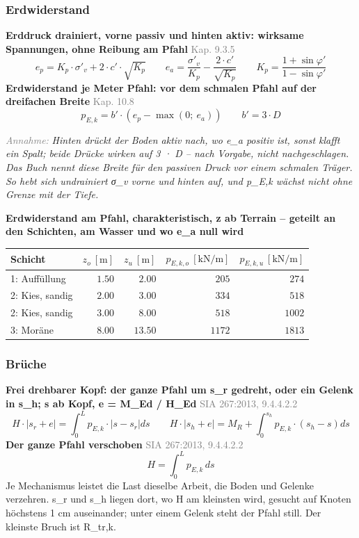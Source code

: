 \documentclass[11pt,a4paper]{article}
\newcommand{\normref}[1]{{\small\textcolor{gray}{#1}}}
\newcommand{\hinweis}[2]{\par\noindent\textcolor{gray}{\textit{#1:}} \textit{#2}\par}
\begin{document}
\subsubsection{Erdwiderstand}
\noindent\textbf{Erddruck drainiert, vorne passiv und hinten aktiv: wirksame Spannungen, ohne Reibung am Pfahl} \hfill \normref{Kap. 9.3.5}
\begin{equation*}
e_p = K_p \cdot \sigma'_v + 2 \cdot c' \cdot \sqrt{K_p} \qquad e_a = \frac{\sigma'_v}{K_p} - \frac{2 \cdot c'}{\sqrt{K_p}} \qquad K_p = \frac{1 + \sin\varphi'}{1 - \sin\varphi'}
\end{equation*}
\noindent\textbf{Erdwiderstand je Meter Pfahl: vor dem schmalen Pfahl auf der dreifachen Breite} \hfill \normref{Kap. 10.8}
\begin{equation*}
p_{E,k} = b' \cdot \left(e_p - \max\left(0;\ e_a\right)\right) \qquad b' = 3 \cdot D
\end{equation*}
\hinweis{Annahme}{Hinten drückt der Boden aktiv nach, wo e\_a positiv ist, sonst klafft ein Spalt; beide Drücke wirken auf 3 · D – nach Vorgabe, nicht nachgeschlagen. Das Buch nennt diese Breite für den passiven Druck vor einem schmalen Träger. So hebt sich undrainiert σ\_v vorne und hinten auf, und p\_E,k wächst nicht ohne Grenze mit der Tiefe.}
\noindent\textbf{Erdwiderstand am Pfahl, charakteristisch, z ab Terrain – geteilt an den Schichten, am Wasser und wo e\_a null wird}
\begin{longtable}{lrrrr}
\hline
Schicht & $z_o\ [\mathrm{m}]$ & $z_u\ [\mathrm{m}]$ & $p_{E,k,o}\ [\mathrm{kN/m}]$ & $p_{E,k,u}\ [\mathrm{kN/m}]$ \\
\hline
\endhead
1: Auffüllung & $1.50$ & $2.00$ & $205$ & $274$ \\
2: Kies, sandig & $2.00$ & $3.00$ & $334$ & $518$ \\
2: Kies, sandig & $3.00$ & $8.00$ & $518$ & $1002$ \\
3: Moräne & $8.00$ & $13.50$ & $1172$ & $1813$ \\
\hline
\end{longtable}
\subsubsection{Brüche}
\noindent\textbf{Frei drehbarer Kopf: der ganze Pfahl um s\_r gedreht, oder ein Gelenk in s\_h; s ab Kopf, e = M\_Ed / H\_Ed} \hfill \normref{SIA 267:2013, 9.4.4.2.2}
\begin{equation*}
H \cdot \left|s_r + e\right| = \int_0^L p_{E,k} \cdot \left|s - s_r\right| ds \qquad H \cdot \left|s_h + e\right| = M_R + \int_0^{s_h} p_{E,k} \cdot \left(s_h - s\right) ds
\end{equation*}
\noindent\textbf{Der ganze Pfahl verschoben} \hfill \normref{SIA 267:2013, 9.4.4.2.2}
\begin{equation*}
H = \int_0^L p_{E,k}\, ds
\end{equation*}
Je Mechanismus leistet die Last dieselbe Arbeit, die Boden und Gelenke verzehren. s\_r und s\_h liegen dort, wo H am kleinsten wird, gesucht auf Knoten höchstens 1 cm auseinander; unter einem Gelenk steht der Pfahl still. Der kleinste Bruch ist R\_tr,k.
\end{document}
